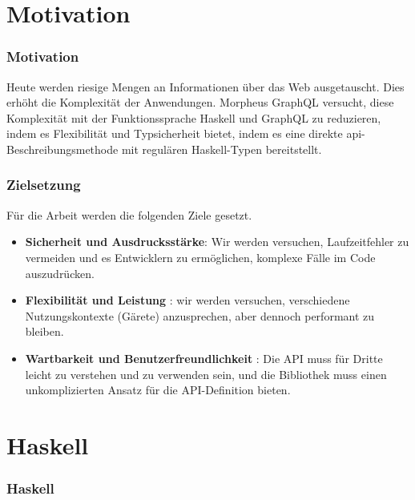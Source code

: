 
\section{Motivation}

\begin{frame}{}
    \frametitle{Motivation}

    Heute werden riesige Mengen an Informationen über das Web ausgetauscht. Dies erhöht die Komplexität der Anwendungen. Morpheus GraphQL versucht, diese Komplexität mit der Funktionssprache Haskell und GraphQL zu reduzieren, indem es Flexibilität und Typsicherheit bietet, indem es eine direkte api-Beschreibungsmethode mit regulären Haskell-Typen bereitstellt. 

\end{frame}

\begin{frame}
    \frametitle{Zielsetzung}

    Für die Arbeit werden die folgenden Ziele gesetzt.    

    \begin{itemize}

        \item \textbf{Sicherheit und Ausdrucksstärke}: Wir werden versuchen, Laufzeitfehler zu vermeiden und es Entwicklern zu ermöglichen, komplexe Fälle im Code auszudrücken.
        
        \item \textbf{Flexibilität und Leistung} : wir werden  versuchen, verschiedene Nutzungskontexte (Gärete) anzusprechen, aber dennoch performant zu bleiben. 
        
        \item \textbf{Wartbarkeit und Benutzerfreundlichkeit}
       :  Die API muss für Dritte leicht zu verstehen und zu verwenden sein, und die Bibliothek muss einen unkomplizierten Ansatz für die API-Definition bieten. 

    \end{itemize}   
\end{frame}

\section{Haskell}

\begin{frame}{}
    \frametitle{Haskell}
\end{frame}


